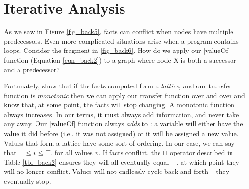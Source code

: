 \documentclass[12pt]{report}
\begin{document}




\section{Iterative Analysis}
As we saw in Figure \ref{fig_back5}, facts can conflict
when nodes have multiple predecessors. Even more complicated
situations arise when a program contains loops. Consider
the fragment in \ref{fig_back6}. How do we apply
our |valueOf| function (Equation \ref{eqn_back2}) to a graph
where node X is both a successor and a predecessor?

Fortunately, \citep{SoAndSoXX} show that if the facts computed form a
\emph{lattice}, and our transfer function is \emph{monotonic} then we
can apply our transfer function over and over and know that, at some
point, the facts will stop changing.  A monotonic function always
increases. In our terms, it must always add information, and never
take any away. Our |valueOf| function always \emph{adds} to \out: a
variable will either have the value it did before (i.e., it was not
assigned) or it will be assigned a new value. Values that form a
lattice have some sort of ordering. In our case, we can say that $\bot
\leq v \leq \top$, for all values $v$. If facts conflict, the $\sqcup$
operator described in Table \ref{tbl_back2} ensures they will all
eventually equal $\top$, at which point they will no longer conflict. Values
will not endlessly cycle back and forth -- they eventually stop. 
\end{document}
